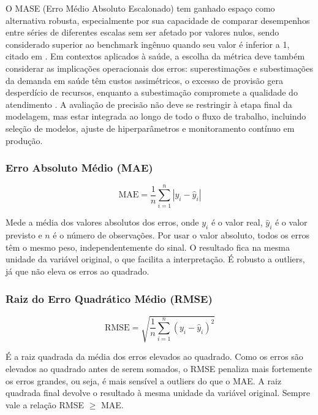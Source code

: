 \documentclass[
    12pt,
    openright,
    oneside,
    a4paper,
    english,
    brazil
]{abntex2}
\begin{document}
O MASE (Erro Médio Absoluto Escalonado) tem ganhado espaço como alternativa robusta, especialmente por sua capacidade de comparar desempenhos entre séries de diferentes escalas sem ser afetado por valores nulos, sendo considerado superior ao benchmark ingênuo quando seu valor é inferior a 1, citado em . Em contextos aplicados à saúde, a escolha da métrica deve também considerar as implicações operacionais dos erros: superestimações e subestimações da demanda em saúde têm custos assimétricos, o excesso de provisão gera desperdício de recursos, enquanto a subestimação compromete a qualidade do atendimento . A avaliação de precisão não deve se restringir à etapa final da modelagem, mas estar integrada ao longo de todo o fluxo de trabalho, incluindo seleção de modelos, ajuste de hiperparâmetros e monitoramento contínuo em produção.

\subsubsection{Erro Absoluto Médio (MAE)}
\label{subsec:mae}

\begin{equation}
\text{MAE} = \frac{1}{n}\sum_{i=1}^{n}\left|y_i - \hat{y}_i\right|
\end{equation}

Mede a média dos valores absolutos dos erros, onde $y_i$ é o valor real, $\hat{y}_i$ é o valor previsto e $n$ é o número de observações. Por usar o valor absoluto, todos os erros têm o mesmo peso, independentemente do sinal. O resultado fica na mesma unidade da variável original, o que facilita a interpretação. É robusto a outliers, já que não eleva os erros ao quadrado.

\subsubsection{Raiz do Erro Quadrático Médio (RMSE)}
\label{subsec:rmse}

\begin{equation}
\text{RMSE} = \sqrt{\frac{1}{n}\sum_{i=1}^{n}\left(y_i - \hat{y}_i\right)^2}
\end{equation}

É a raiz quadrada da média dos erros elevados ao quadrado. Como os erros são elevados ao quadrado antes de serem somados, o RMSE penaliza mais fortemente os erros grandes, ou seja, é mais sensível a outliers do que o MAE. A raiz quadrada final devolve o resultado à mesma unidade da variável original. Sempre vale a relação RMSE $\geq$ MAE.
\end{document}
